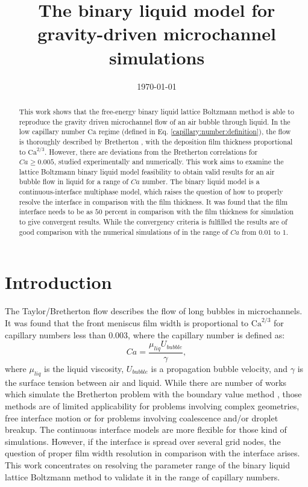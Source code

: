 \documentclass{article}
\title{The binary liquid model for gravity-driven microchannel simulations}
\date{\today}
\newcommand{\Ca}{\mathrm{Ca}}
\begin{document}
\maketitle

\begin{abstract}
This work shows that the free-energy binary liquid lattice Boltzmann method is able to
reproduce the gravity driven microchannel flow of an air bubble through liquid. In the low capillary
number
$\Ca$ regime (defined in Eq. \ref{capillary:number:definition}), the flow is thoroughly described by
Bretherton \cite{bretherton},
with the deposition film thickness proportional to $\Ca^{2/3}$. However, there are deviations
from the Bretherton correlations for $Ca\geq 0.005$, studied experimentally and numerically. This
work aims to examine the lattice Boltzmann binary liquid model feasibility to obtain valid results
for an air bubble flow in liquid for a range of $Ca$ number. The binary
liquid model is a continuous-interface multiphase model, which raises
the question of how to properly resolve the interface in comparison with the film thickness.
It was found that the film interface needs to be as $50$
percent in comparison with the film thickness for simulation to give convergent results. While
the convergency criteria is fulfilled the results are of good comparison with the
numerical simulations of \citet{giavedoni-numerical} in the range of $Ca$ from $0.01$ to $1$. 
\end{abstract}


\section{Introduction}
The Taylor/Bretherton \cite{bretherton} flow describes the flow of long bubbles in
microchannels. It was found that the front meniscus film width is proportional
to $\Ca^{2/3}$ for capillary numbers less than $0.003$, where the capillary number is defined as:
\begin{equation}
\label{capillary:number:definition}
Ca=\frac{\mu_{liq} U_{bubble}}{\gamma},
\end{equation}
where $\mu_{liq}$ is the liquid viscosity, $U_{bubble}$ is a propagation bubble velocity, and
$\gamma$ is the surface tension between air and liquid.
While there are number
of works which simulate the Bretherton problem with the boundary value method
\cite{ingham-plates,heil-bretherton}, those methods are of limited applicability for problems
involving complex geometries, free interface motion or for problems involving coalescence and/or
droplet breakup. The continuous interface models are more flexible for those kind of simulations.
However, if the interface is spread over several grid nodes, the question of
proper film width resolution in comparison with the interface arises.  This work
concentrates on resolving the parameter range of the binary liquid lattice
Boltzmann method to validate it in the range of capillary numbers.
\end{document}
